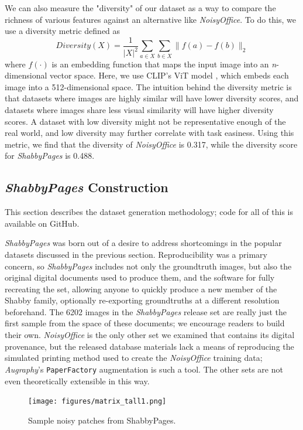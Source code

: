 \documentclass[runningheads]{llncs}
\begin{document}
We can also measure the "diversity" of our dataset as a way to compare the richness of various features against an alternative like \emph{NoisyOffice}.
To do this, we use a diversity metric \cite{larson-etal-2019-outlier} defined as
$$
Diversity(X) = \frac{1}{|X|^2} \sum_{a\in X} \sum_{b\in X} \|f(a)-f(b)\|_2
$$
where $f(\cdot)$ is an embedding function that maps the input image 
into an \emph{n}-dimensional vector space.
Here, we use CLIP's ViT model \cite{clip}, which embeds each image into a 512-dimensional space.
The intuition behind the diversity metric is that datasets where images are highly similar will have lower diversity scores, and datasets where images share less visual similarity will have higher diversity scores.
A dataset with low diversity might not be representative enough of the real world, and low diversity may further correlate with task easiness.
Using this metric, we find that the diversity of \emph{NoisyOffice} is 0.317, while the diversity score for \emph{ShabbyPages} is 0.488.


\subsection{\emph{ShabbyPages} Construction}
This section describes the dataset generation methodology; code for all of this is available on GitHub.

\emph{ShabbyPages} was born out of a desire to address shortcomings in the popular datasets discussed in the previous section.
Reproducibility was a primary concern, so \emph{ShabbyPages} includes not only the groundtruth images, but also the original digital documents used to produce them, and the software for fully recreating the set, allowing anyone to quickly produce a new member of the Shabby family, optionally re-exporting groundtruths at a different resolution beforehand.
The 6202 images in the \emph{ShabbyPages} release set are really just the first sample from the space of these documents; we encourage readers to build their own.
\emph{NoisyOffice} is the only other set we examined that contains its digital provenance, but the released database materials lack a means of reproducing the simulated printing method used to create the \emph{NoisyOffice} training data; \emph{Augraphy}'s \texttt{PaperFactory} augmentation is such a tool.
The other sets are not even theoretically extensible in this way.

\begin{figure}
    \texttt{[image: figures/matrix\_tall1.png]}
    \caption{Sample noisy patches from ShabbyPages.}
    \label{fig:matrix_tall1}
\end{figure}
\end{document}
